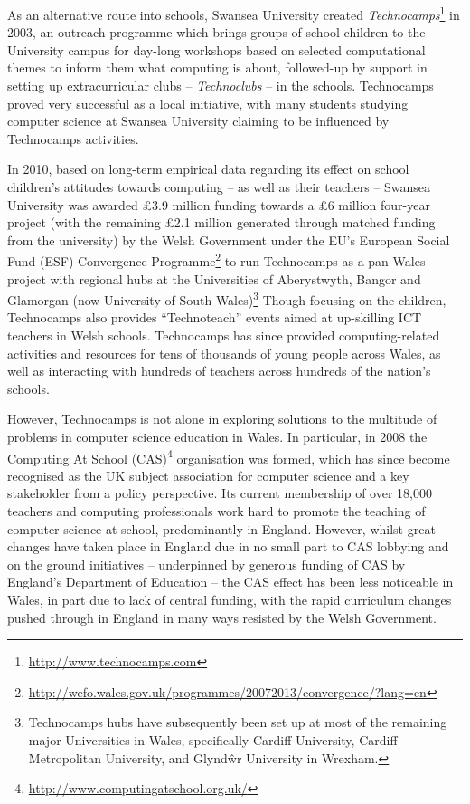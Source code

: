 \documentclass{sig-alternate}
\begin{document}
As an alternative route into schools, Swansea University created
\emph{Technocamps}\footnote{\url{http://www.technocamps.com}} in 2003,
an outreach programme which brings groups of school children to the
University campus for day-long workshops based on selected
computational themes to inform them what computing is about,
followed-up by support in setting up extracurricular clubs --
\emph{Technoclubs} -- in the schools.  Technocamps proved very
successful as a local initiative, with many students studying computer
science at Swansea University claiming to be influenced by Technocamps
activities.

In 2010, based on long-term empirical data regarding its effect on
school children's attitudes towards computing -- as well as their
teachers -- Swansea University was awarded \pounds 3.9 million funding
towards a \pounds 6 million four-year project (with the remaining
\pounds 2.1 million generated through matched funding from the
university) by the Welsh Government under the EU's European Social
Fund (ESF) Convergence
Programme\footnote{\url{http://wefo.wales.gov.uk/programmes/20072013/convergence/?lang=en}}
to run Technocamps as a pan-Wales project with regional hubs at the
Universities of Aberystwyth, Bangor and Glamorgan (now University of
South Wales)\footnote{Technocamps hubs have subsequently been set up
at most of the remaining major Universities in Wales, specifically
Cardiff University, Cardiff Metropolitan University, and Glynd\^wr
University in Wrexham.}  Though focusing on the children, Technocamps
also provides ``Technoteach'' events aimed at up-skilling ICT teachers
in Welsh schools.  Technocamps has since provided computing-related
activities and resources for tens of thousands of young people across
Wales, as well as interacting with hundreds of teachers across
hundreds of the nation's schools.

However, Technocamps is not alone in exploring solutions to the
multitude of problems in computer science education in Wales.  In
particular, in 2008 the Computing At School
(CAS)\footnote{\url{http://www.computingatschool.org.uk/}}
organisation was formed, which has since become recognised as the UK
subject association for computer science and a key stakeholder from a
policy perspective. Its current membership of over 18,000 teachers and
computing professionals work hard to promote the teaching of computer
science at school, predominantly in England.  However, whilst great
changes have taken place in England due in no small part to CAS
lobbying and on the ground initiatives -- underpinned by generous
funding of CAS by England's Department of Education -- the CAS effect
has been less noticeable in Wales, in part due to lack of central
funding, with the rapid curriculum changes pushed through in England
in many ways resisted by the Welsh Government.
\end{document}
